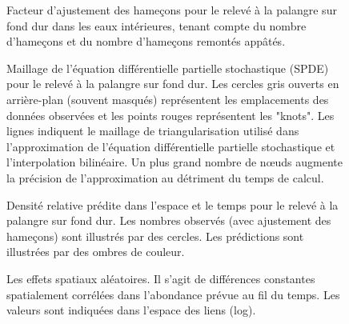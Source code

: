 \documentclass[french,11pt]{book}
\begin{document}
\begin{figure}[htb]

{\centering {} 

}

\caption{Facteur d’ajustement des hameçons pour le relevé à la palangre sur fond dur dans les eaux intérieures, tenant compte du nombre d’hameçons et du nombre d’hameçons remontés appâtés.}\label{fig:hbll-hook-adjustment}
\end{figure}
\begin{figure}[htb]

{\centering {} 

}

\caption{Maillage de l’équation différentielle partielle stochastique (SPDE) pour le relevé à la palangre sur fond dur. Les cercles gris ouverts en arrière-plan (souvent masqués) représentent les emplacements des données observées et les points rouges représentent les "knots". Les lignes indiquent le maillage de triangularisation utilisé dans l’approximation de l’équation différentielle partielle stochastique et l’interpolation bilinéaire. Un plus grand nombre de nœuds augmente la précision de l’approximation au détriment du temps de calcul.}\label{fig:hbll-spde}
\end{figure}
\begin{figure}[htb]

{\centering {} 

}

\caption{Densité relative prédite dans l’espace et le temps pour le relevé à la palangre sur fond dur. Les nombres observés (avec ajustement des hameçons) sont illustrés par des cercles. Les prédictions sont illustrées par des ombres de couleur.}\label{fig:hbll-predicted-spacetime}
\end{figure}
\begin{figure}[htb]

{\centering {} 

}

\caption{Les effets spatiaux aléatoires. Il s’agit de différences constantes spatialement corrélées dans l’abondance prévue au fil du temps. Les valeurs sont indiquées dans l’espace des liens (log).}\label{fig:hbll-spatial-re}
\end{figure}
\end{document}
